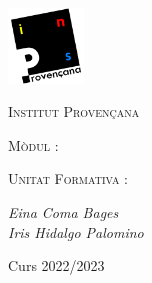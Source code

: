 \begin{titlepage}
	\centering
	\includegraphics*[width=0.15\textwidth]{provencana_color.pdf}
	\par\vspace{0.5cm}

	{\scshape\Large Institut Provençana \par}

	\vspace{1cm}

	{\itshape\Large \acttipus \par}
	{\bfseries\LARGE \actnom \par}
	
	\vspace{1cm}
	
	{\scshape\large Mòdul \modulnum: \par}
	{\scshape\Large \modulnom \par}

	\vspace{1cm}
	
	{\scshape\normalsize Unitat Formativa \ufnum: \par}
	{\scshape\large \ufnom \par}

	\vfill
	{\Large\itshape Eina Coma Bages \\ Iris Hidalgo Palomino\par}
	\vfill

	Curs 2022/2023
\end{titlepage}